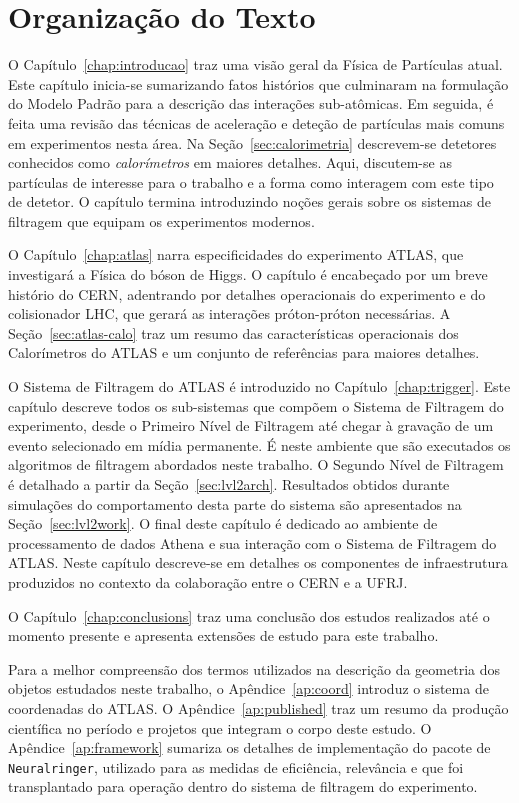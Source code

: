 \section{Organização do Texto}

O Capítulo~\ref{chap:introducao} traz uma visão geral da Física de Partículas
atual. Este capítulo inicia-se sumarizando fatos histórios que culminaram na
formulação do Modelo Padrão para a descrição das interações sub-atômicas. Em
seguida, é feita uma revisão das técnicas de aceleração e deteção de
partículas mais comuns em experimentos nesta área. Na
Seção~\ref{sec:calorimetria} descrevem-se detetores conhecidos como 
\textit{calorímetros} em maiores detalhes. Aqui, discutem-se as partículas de
interesse para o trabalho e a forma como interagem com este tipo de detetor. O
capítulo termina introduzindo noções gerais sobre os sistemas de filtragem que
equipam os experimentos modernos.

O Capítulo~\ref{chap:atlas} narra especificidades do experimento ATLAS, que
investigará a Física do bóson de Higgs. O capítulo é encabeçado por um breve
histório do CERN, adentrando por detalhes operacionais do experimento e do
colisionador LHC, que gerará as interações próton-próton necessárias. A
Seção~\ref{sec:atlas-calo} traz um resumo das características operacionais dos
Calorímetros do ATLAS e um conjunto de referências para maiores detalhes.

O Sistema de Filtragem do ATLAS é introduzido no
Capítulo~\ref{chap:trigger}. Este capítulo descreve todos os sub-sistemas que
compõem o Sistema de Filtragem do experimento, desde o Primeiro Nível de
Filtragem até chegar à gravação de um evento selecionado em mídia
permanente. É neste ambiente que são executados os algoritmos de filtragem
abordados neste trabalho. O Segundo Nível de Filtragem é detalhado a partir da
Seção~\ref{sec:lvl2arch}. Resultados obtidos durante simulações do
comportamento desta parte do sistema são apresentados na
Seção~\ref{sec:lvl2work}. O final deste capítulo é dedicado ao ambiente de
processamento de dados Athena e sua interação com o Sistema de Filtragem do
ATLAS. Neste capítulo descreve-se em detalhes os componentes de infraestrutura
produzidos no contexto da colaboração entre o CERN e a UFRJ.


O Capítulo~\ref{chap:conclusions} traz uma conclusão dos estudos realizados
até o momento presente e apresenta extensões de estudo para este trabalho.

Para a melhor compreensão dos termos utilizados na descrição da geometria dos
objetos estudados neste trabalho, o Apêndice~\ref{ap:coord} introduz o sistema
de coordenadas do ATLAS. O Apêndice~\ref{ap:published} traz um resumo da
produção científica no período e projetos que integram o corpo deste estudo. O
Apêndice~\ref{ap:framework} sumariza os detalhes de implementação do
pacote de  \texttt{Neuralringer}, utilizado para as medidas de
eficiência, relevância e que foi transplantado para operação dentro do sistema
de filtragem do experimento.

